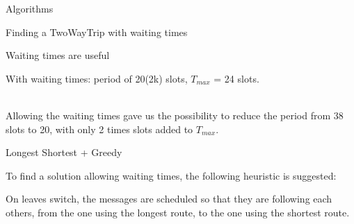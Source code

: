 \documentclass[a4paper,10pt]{report}
\begin{document}
\begin{chapter}{Algorithms}
\begin{section}{Finding a TwoWayTrip with waiting times}
\begin{subsection}{Waiting times are useful}
{{{
  }
  
    With waiting times: period of 20(2k) slots, $T_{max}$ = 24 slots.

  }}\\
  
  Allowing the waiting times gave us the possibility to reduce the period from 38 slots to 20, with only 2 times slots added to $T_{max}$.
\end{subsection}
\begin{subsection}{Longest Shortest + Greedy}
 

To find a solution allowing waiting times, the following heuristic is suggested:

On leaves switch, the messages are scheduled so that they are following each others, from the one using the longest route, to the one using the shortest route.


\end{subsection}
\end{section}
\end{chapter}
\end{document}
